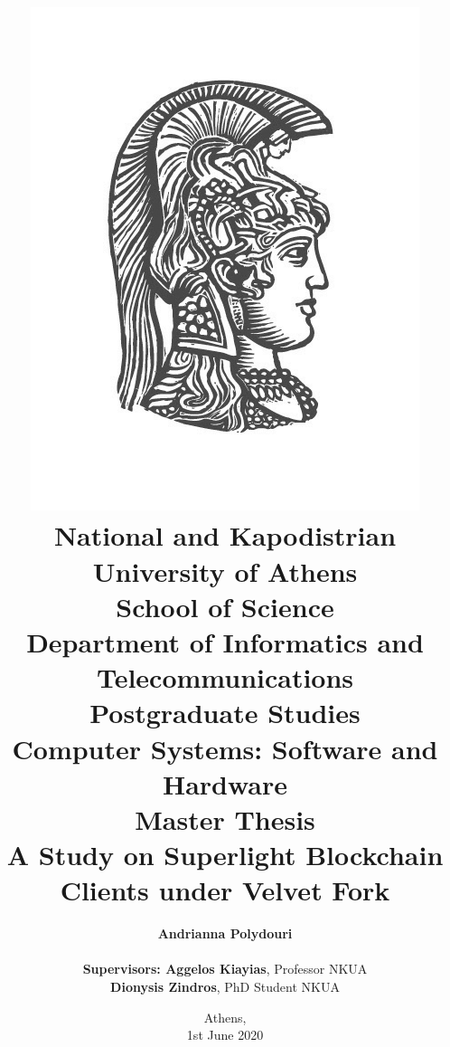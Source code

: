 \title{
    {\includegraphics[scale=0.8]{figures/logo_uoa.jpg}}\\
    {\large National and Kapodistrian University of Athens \\
    School of Science \\
    Department of Informatics and Telecommunications}\\
    \vspace{1cm}
    Postgraduate Studies \\
    Computer Systems: Software and Hardware\\
    \vspace{10mm}
    {Master Thesis}\\
    \vspace{3mm}
    {\textbf{\LARGE A Study on Superlight Blockchain Clients under Velvet Fork}}\\
    \vspace{1cm}
    }

\author{
    \textbf{Andrianna Polydouri} \\
    \vspace{1cm} \\
    \textbf{Supervisors: Aggelos Kiayias}, Professor NKUA\\
    \hspace{3.68cm}
    \textbf{Dionysis Zindros}, PhD Student NKUA
    \vspace{2cm}
}

\date{Athens, \\ 1st June 2020}